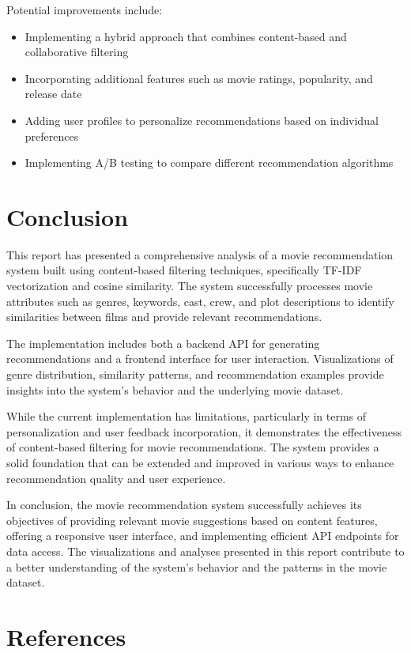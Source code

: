 \documentclass[12pt,a4paper]{article}
\begin{document}
Potential improvements include:

\begin{itemize}
    \item Implementing a hybrid approach that combines content-based and collaborative filtering
    \item Incorporating additional features such as movie ratings, popularity, and release date
    \item Adding user profiles to personalize recommendations based on individual preferences
    \item Implementing A/B testing to compare different recommendation algorithms
\end{itemize}

\section{Conclusion}

This report has presented a comprehensive analysis of a movie recommendation system built using content-based filtering techniques, specifically TF-IDF vectorization and cosine similarity. The system successfully processes movie attributes such as genres, keywords, cast, crew, and plot descriptions to identify similarities between films and provide relevant recommendations.

The implementation includes both a backend API for generating recommendations and a frontend interface for user interaction. Visualizations of genre distribution, similarity patterns, and recommendation examples provide insights into the system's behavior and the underlying movie dataset.

While the current implementation has limitations, particularly in terms of personalization and user feedback incorporation, it demonstrates the effectiveness of content-based filtering for movie recommendations. The system provides a solid foundation that can be extended and improved in various ways to enhance recommendation quality and user experience.

In conclusion, the movie recommendation system successfully achieves its objectives of providing relevant movie suggestions based on content features, offering a responsive user interface, and implementing efficient API endpoints for data access. The visualizations and analyses presented in this report contribute to a better understanding of the system's behavior and the patterns in the movie dataset.

\section{References}
\end{document}

